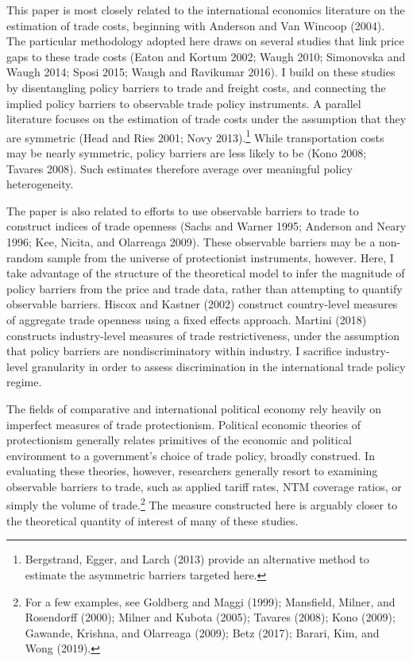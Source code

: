\documentclass{puthesis}
\begin{document}
This paper is most closely related to the international economics
literature on the estimation of trade costs, beginning with Anderson and
Van Wincoop (2004). The particular methodology adopted here draws on
several studies that link price gaps to these trade costs (Eaton and
Kortum 2002; Waugh 2010; Simonovska and Waugh 2014; Sposi 2015; Waugh
and Ravikumar 2016). I build on these studies by disentangling policy
barriers to trade and freight costs, and connecting the implied policy
barriers to observable trade policy instruments. A parallel literature
focuses on the estimation of trade costs under the assumption that they
are symmetric (Head and Ries 2001; Novy 2013).\footnote{Bergstrand,
  Egger, and Larch (2013) provide an alternative method to estimate the
  asymmetric barriers targeted here.} While transportation costs may be
nearly symmetric, policy barriers are less likely to be (Kono 2008;
Tavares 2008). Such estimates therefore average over meaningful policy
heterogeneity.

The paper is also related to efforts to use observable barriers to trade
to construct indices of trade openness (Sachs and Warner 1995; Anderson
and Neary 1996; Kee, Nicita, and Olarreaga 2009). These observable
barriers may be a non-random sample from the universe of protectionist
instruments, however. Here, I take advantage of the structure of the
theoretical model to infer the magnitude of policy barriers from the
price and trade data, rather than attempting to quantify observable
barriers. Hiscox and Kastner (2002) construct country-level measures of
aggregate trade openness using a fixed effects approach. Martini (2018)
constructs industry-level measures of trade restrictiveness, under the
assumption that policy barriers are nondiscriminatory within industry. I
sacrifice industry-level granularity in order to assess discrimination
in the international trade policy regime.

The fields of comparative and international political economy rely
heavily on imperfect measures of trade protectionism. Political economic
theories of protectionism generally relates primitives of the economic
and political environment to a government's choice of trade policy,
broadly construed. In evaluating these theories, however, researchers
generally resort to examining observable barriers to trade, such as
applied tariff rates, NTM coverage ratios, or simply the volume of
trade.\footnote{For a few examples, see Goldberg and Maggi (1999);
  Mansfield, Milner, and Rosendorff (2000); Milner and Kubota (2005);
  Tavares (2008); Kono (2009); Gawande, Krishna, and Olarreaga (2009);
  Betz (2017); Barari, Kim, and Wong (2019).} The measure constructed
here is arguably closer to the theoretical quantity of interest of many
of these studies.
\end{document}
